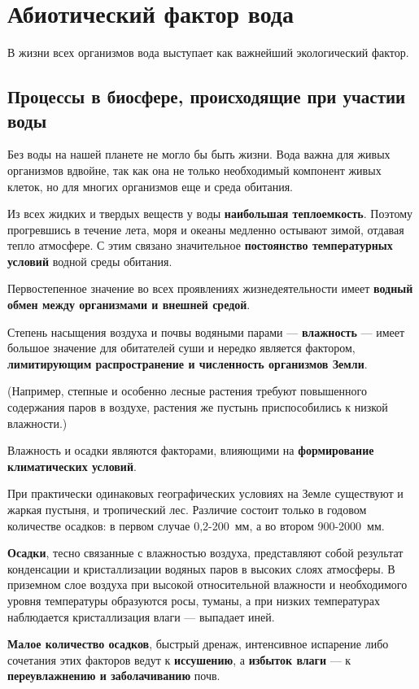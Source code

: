 \documentclass{bmstu}
\begin{document}
\chapter{Абиотический фактор вода}

В жизни всех организмов вода выступает как важнейший экологический фактор.

\section{Процессы в биосфере, происходящие при участии воды}

Без воды на нашей планете не могло бы быть жизни. Вода важна для живых
организмов вдвойне, так как она не только необходимый компонент живых клеток, но
для многих организмов еще и среда обитания.

Из всех жидких и твердых веществ у воды \textbf{наибольшая теплоемкость}.
Поэтому прогревшись в течение лета, моря и океаны медленно остывают зимой,
отдавая тепло атмосфере. С этим связано значительное \textbf{постоянство
температурных условий} водной среды обитания.

Первостепенное значение во всех проявлениях жизнедеятельности имеет
\textbf{водный обмен между организмами и внешней средой}.

Степень насыщения воздуха и почвы водяными парами --- \textbf{влажность} ---
имеет большое значение для обитателей суши и нередко является фактором,
\textbf{лимитирующим распространение и численность организмов Земли}.

(Например, степные и особенно лесные растения требуют повышенного содержания
паров в воздухе, растения же пустынь приспособились к низкой влажности.)

Влажность и осадки являются факторами, влияющими на \textbf{формирование
климатических условий}.

При практически одинаковых географических условиях на Земле существуют и жаркая
пустыня, и тропический лес. Различие состоит только в годовом количестве
осадков: в первом случае 0,2-200~мм, а во втором 900-2000~мм.

\textbf{Осадки}, тесно связанные с влажностью воздуха, представляют собой
результат конденсации и кристаллизации водяных паров в высоких слоях атмосферы.
В приземном слое воздуха при высокой относительной влажности и необходимого
уровня температуры образуются росы, туманы, а при низких температурах
наблюдается кристаллизация влаги --- выпадает иней.

\textbf{Малое количество осадков}, быстрый дренаж, интенсивное испарение либо
сочетания этих факторов ведут к \textbf{иссушению}, а \textbf{избыток влаги} ---
к \textbf{переувлажнению и заболачиванию} почв.
\end{document}
